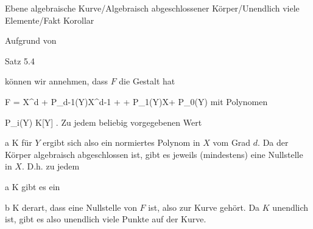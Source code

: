 {Ebene algebraische Kurve/Algebraisch abgeschlossener Körper/Unendlich viele Elemente/Fakt}
{Korollar}
{}
{



\faktzusatz {}
\faktzusatz {}





}
{





Aufgrund von

Satz 5.4

können wir annehmen, dass $F$ die Gestalt hat

\mavergleichskettedisp
{\vergleichskette
{F
}
{ =} { X^d + P_{d-1}(Y)X^{d-1}  + \cdots +  P_1(Y)X+ P_0(Y)
}
{ } {
}
{ } {
}
{ } {
}
}
{}{}{}
mit Polynomen

\mavergleichskette
{\vergleichskette
{ P_i(Y)
}
{ \in }{ K[Y]
}
{  }{
}
{    }{
}
{   }{
}
}
{}{}{.}
Zu jedem beliebig vorgegebenen Wert

\mavergleichskette
{\vergleichskette
{ a
}
{ \in }{ K
}
{  }{
}
{    }{
}
{   }{
}
}
{}{}{}
für $Y$ ergibt sich also ein normiertes Polynom in $X$ vom Grad $d$. Da der Körper algebraisch abgeschlossen ist, gibt es jeweils (mindestens) eine Nullstelle in $X$. D.h. zu jedem

\mavergleichskette
{\vergleichskette
{ a
}
{ \in }{ K
}
{  }{
}
{    }{
}
{   }{
}
}
{}{}{}
gibt es ein

\mavergleichskette
{\vergleichskette
{ b
}
{ \in }{ K
}
{  }{
}
{    }{
}
{   }{
}
}
{}{}{}
derart, dass
 eine Nullstelle von $F$ ist, also zur Kurve gehört. Da $K$ unendlich ist, gibt es also unendlich viele Punkte auf der Kurve.




}







